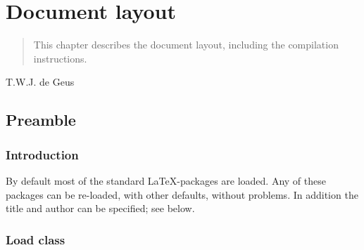 
\chapter{Document layout}

\begin{frontmatter}

\begin{abstract}
This chapter describes the document layout, including the compilation instructions.
\end{abstract}


\begin{remark}
  T.W.J. de Geus
\end{remark}

\end{frontmatter}

\section{Preamble}

\subsection{Introduction}

By default most of the standard \LaTeX-packages are loaded. Any of these packages can be re-loaded, with other defaults, without problems. In addition the title and author can be specified; see below.

\subsection{Load class}

